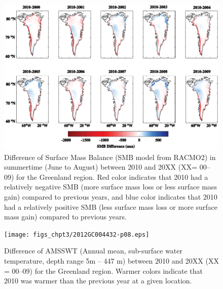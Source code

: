 \clearpage
\begin{figure}
 \centering
 \includegraphics{figs_chpt3/2012GC004432-p07.eps} 
 \caption[Difference of Surface Mass Balance (SMB model from RACMO2) in summertime (June to August) between 2010 and 20XX (XX= 00–09) for the Greenland region.]{Difference of Surface Mass Balance (SMB model from RACMO2) in summertime (June to August) between 2010 and 20XX (XX= 00–09) for the Greenland region. Red color indicates that 2010 had a relatively negative SMB (more surface mass loss or less surface mass gain) compared to previous years, and blue color indicates that 2010 had a relatively positive SMB (less surface mass loss or more surface mass gain) compared to previous years.}
 \label{fig:fig7}
\end{figure}

\clearpage
\begin{figure}
 \centering
 \texttt{[image: figs\_chpt3/2012GC004432-p08.eps]} 
 \caption[Difference of AMSSWT (Annual mean, sub-surface water temperature, depth range 5 m – 447 m) between 2010 and 20XX (XX = 00–09) for the Greenland region.]{Difference of AMSSWT (Annual mean, sub-surface water temperature, depth range 5m – 447 m) between 2010 and 20XX (XX = 00–09) for the Greenland region. Warmer colors indicate that 2010 was warmer than the previous year at a given location.}
 \label{fig:fig8}
\end{figure}

